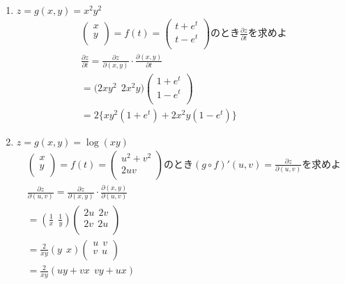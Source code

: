 \documentclass[a4paper,10pt]{jarticle}
\begin{document}
\section{}
\begin{enumerate}
\item $z = g(x,y) = x^2y^2$\begin{gather*}
 	\left(    \begin{array}{r}
		x \\
		y \\
	\end{array}  \right)
	= f(t) = 
 	\left(    \begin{array}{r}
		t+e^t \\
		t-e^t \\
	\end{array}  \right)
	\text{のとき}\frac{\partial z}{\partial t}\text{を求めよ} \\
	\frac{\partial z}{\partial t} = \frac{\partial z}{\partial(x,y)} \cdot \frac{\partial(x,y)}{\partial t} \\
	=\big(2xy^2 \ \ 2x^2y\big) 
 	\left(    \begin{array}{r}
		1+e^t \\
		1-e^t \\
	\end{array}  \right) \\
	= 2\{xy^2(1+e^t) + 2x^2y(1-e^t)\}
\end{gather*}
\item$ z = g(x,y) = \log(xy) $\begin{gather*}
 	\left(    \begin{array}{r}
		x \\
		y \\
	\end{array}  \right)
	= f(t) = 
 	\left(    \begin{array}{r}
		u^2+v^2 \\
		2uv \\	\end{array}  \right)
	\text{のとき}(g \circ f)' (u,v) = \frac{\partial z}{\partial(u,v)}\text{を求めよ} \\
	\frac{\partial z}{\partial(u,v)} = \frac{\partial z}{\partial(x,y)} \cdot \frac{\partial(x,y)}{\partial(u,v)}\\
	=\left(\frac{1}{x}\ \ \frac{1}{y}\right)
	\left(    \begin{array}{rr}
		2u \ \ 2v \\
		2v \ \ 2u \\
	\end{array}  \right) \\
	=\frac{2}{xy}\left(y\ \ x\right)
	\left(    \begin{array}{rr}
		u \ \ v \\
		v \ \ u \\
	\end{array}  \right) \\
	=\frac{2}{xy}\left(uy+vx\ \ vy+ux\right)
\end{gather*}
\end{enumerate}
\end{document}
